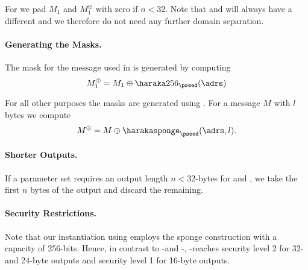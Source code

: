    For \sphincsF we pad $M_1$ and $M_1^{\oplus}$ with zero if $n < 32$.
   Note that \sphincsH
   and \sphincsHmsg will always have a different \adrs and we therefore do not
   need any further domain separation.

   \paragraph{Generating the Masks.} The mask for the message used in \sphincsF
   is generated by computing
   \begin{equation}
      M_1^{\oplus} = M_1 \oplus \haraka256_{\pseed}(\adrs)
   \end{equation}

   For all other purposes the masks are generated using \harakasponge. For a
   message $M$ with $l$ bytes we compute
   \begin{equation*}
      M^{\oplus} = M \oplus \harakasponge_{\pseed}(\adrs, l).
   \end{equation*}

   \paragraph{Shorter Outputs.} If a parameter set requires an
   output length $n < 32$-bytes for \sphincsF and \sphincsPRF,
   we take the first $n$ bytes of the output and discard the remaining.

   \paragraph{Security Restrictions.} Note that our instantiation using \haraka
   employs the sponge construction with a capacity of 256-bits. Hence, in
   contrast to \spx-\shatwo and \spx-\shathree, \spx-\haraka reaches
   security level 2 for 32- and 24-byte outputs and security level 1 for
   16-byte outputs.






